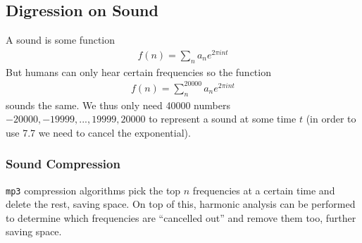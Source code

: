 \subsection{Digression on Sound}
A sound is some function
\begin{align}
    f(n) = \sum_n a_n e^{2\pi int}
\end{align}
But humans can only hear certain frequencies so the function
\begin{align}
    f(n) = \sum_n^{20000} a_n e^{2\pi int}
\end{align}
sounds the same. We thus only need 40000 numbers $-20000, -19999, ..., 19999, 20000$ to represent a sound at some time $t$ (in order to use 7.7 we need to cancel the exponential).
\subsubsection{Sound Compression}
\texttt{mp3} compression algorithms pick the top $n$ frequencies at a certain time and delete the rest, saving space. On top of this, harmonic analysis can be performed to determine which frequencies are ``cancelled out'' and remove them too, further saving space.
